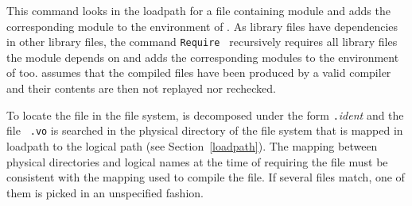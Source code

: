 This command looks in the loadpath for a file containing
module {\qualid} and adds the corresponding module to the environment
of {\Coq}. As library files have dependencies in other library files,
the command {\tt Require {\qualid}} recursively requires all library
files the module {\qualid} depends on and adds the corresponding modules to the
environment of {\Coq} too. {\Coq} assumes that the compiled files have
been produced by a valid {\Coq} compiler and their contents are then not
replayed nor rechecked.

To locate the file in the file system, {\qualid} is decomposed under
the form {\dirpath}{\tt .}{\textsl{ident}} and the file {\ident}{\tt
.vo} is searched in the physical directory of the file system that is
mapped in {\Coq} loadpath to the logical path {\dirpath} (see
Section~\ref{loadpath}). The mapping between physical directories and
logical names at the time of requiring the file must be consistent
with the mapping used to compile the file. If several files match, one of them
is picked in an unspecified fashion.

